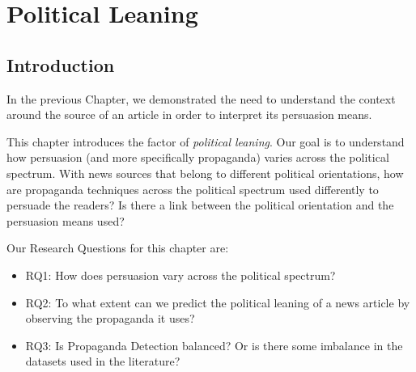 \chapter{\statusgreen Political Leaning}
\label{chap:political_sides}


% 

\section{\statusgreen Introduction}


In the previous Chapter, %
we demonstrated the need to understand the context around the source of an article in order to interpret its persuasion means.

This chapter introduces the factor of \emph{political leaning}.
Our goal is to understand how persuasion (and more specifically propaganda) varies across the political spectrum.
With news sources that belong to different political orientations, how are propaganda techniques across the political spectrum used differently to persuade the readers?
Is there a link between the political orientation and the persuasion means used?


Our Research Questions for this chapter are:
\begin{itemize}
    \item RQ1: How does persuasion vary across the political spectrum?
    \item RQ2: To what extent can we predict the political leaning of a news article by observing the propaganda it uses?
    \item RQ3: Is Propaganda Detection balanced? Or is there some imbalance in the datasets used in the literature?
\end{itemize}

